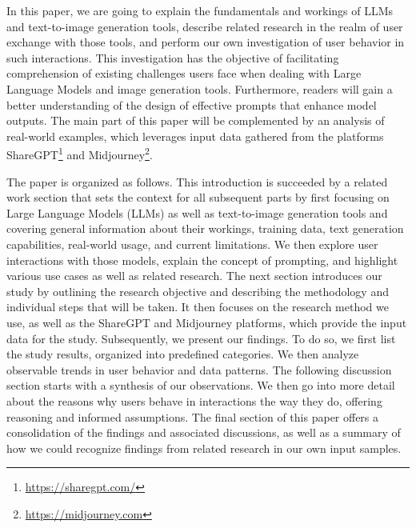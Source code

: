In this paper, we are going to explain the fundamentals and workings of LLMs and text-to-image
generation tools,
describe related research in the realm of user exchange with those tools, and perform our own
investigation of user behavior in such interactions.
This investigation has the objective of facilitating comprehension of existing challenges users
face when dealing with Large Language Models and image generation tools.
Furthermore, readers will gain a better understanding of the design of effective prompts that
enhance model outputs.
The main part of this paper will be complemented by an analysis of real-world examples, which
leverages input data gathered from the platforms ShareGPT\footnote{\url{https://sharegpt.com/}} and
Midjourney\footnote{\url{https://midjourney.com}}.

The paper is organized as follows.
This introduction is succeeded by a related work section that sets the context for all subsequent
parts by first focusing on Large Language Models (LLMs) as well as text-to-image generation
tools and covering general information about
their workings, training data, text generation capabilities, real-world usage, and current limitations.
We then explore user interactions with those models, explain the concept of prompting, and highlight
various use cases as well as related research.
%
The next section introduces our study by outlining the research objective and
describing the methodology and individual steps that will be taken.
It then focuses on the research method we use, as well as the ShareGPT and Midjourney platforms,
which provide the input data for the study.
%
Subsequently, we present our findings.
To do so, we first list the study results, organized into predefined categories.
We then analyze observable trends in user behavior and data patterns.
%
The following discussion section starts with a synthesis of our observations.
We then go into more detail about the reasons why users behave in interactions the way
they do, offering reasoning and informed assumptions.
%
The final section of this paper offers a consolidation of the findings and associated discussions,
as well as a summary of how we could recognize findings from related research in our own input
samples.